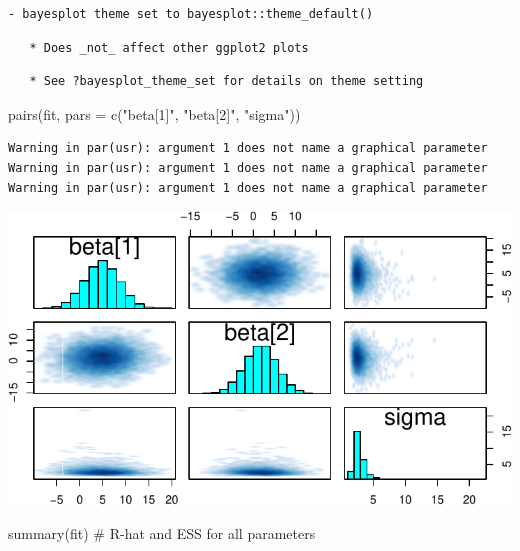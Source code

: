 \documentclass[
  10pt,
]{article}
\newenvironment{Shaded}{\begin{snugshade}}{\end{snugshade}}
\newcommand{\AttributeTok}[1]{\textcolor[rgb]{0.40,0.45,0.13}{#1}}
\newcommand{\CommentTok}[1]{\textcolor[rgb]{0.37,0.37,0.37}{#1}}
\newcommand{\FunctionTok}[1]{\textcolor[rgb]{0.28,0.35,0.67}{#1}}
\newcommand{\NormalTok}[1]{\textcolor[rgb]{0.00,0.23,0.31}{#1}}
\newcommand{\StringTok}[1]{\textcolor[rgb]{0.13,0.47,0.30}{#1}}
\begin{document}
\begin{verbatim}
- bayesplot theme set to bayesplot::theme_default()
\end{verbatim}

\begin{verbatim}
   * Does _not_ affect other ggplot2 plots
\end{verbatim}

\begin{verbatim}
   * See ?bayesplot_theme_set for details on theme setting
\end{verbatim}

\begin{Shaded}
\begin{Highlighting}[]
\FunctionTok{pairs}\NormalTok{(fit, }\AttributeTok{pars =} \FunctionTok{c}\NormalTok{(}\StringTok{"beta[1]"}\NormalTok{, }\StringTok{"beta[2]"}\NormalTok{, }\StringTok{"sigma"}\NormalTok{))}
\end{Highlighting}
\end{Shaded}

\begin{verbatim}
Warning in par(usr): argument 1 does not name a graphical parameter
Warning in par(usr): argument 1 does not name a graphical parameter
Warning in par(usr): argument 1 does not name a graphical parameter
\end{verbatim}

\includegraphics{551-HW-Q2_files/figure-pdf/unnamed-chunk-4-1.pdf}

\begin{Shaded}
\begin{Highlighting}[]
\FunctionTok{summary}\NormalTok{(fit) }\CommentTok{\# R{-}hat and ESS for all parameters}
\end{Highlighting}
\end{Shaded}
\end{document}
